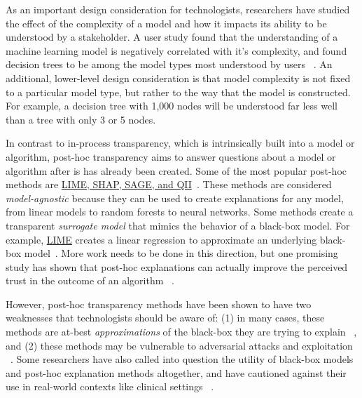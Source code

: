 As an important design consideration for technologists, researchers have studied the effect of the complexity of a model and how it impacts its ability to be understood by a stakeholder. A user study found that the understanding of a machine learning model is negatively correlated with it's complexity, and found decision trees to be among the model types most understood by users ~\cite{DBLP:conf/scai/AllahyariL11}. An additional, lower-level design consideration is that model complexity is not fixed to a particular model type, but rather to the way that the model is constructed. For example, a decision tree with 1,000 nodes will be understood far less well than a tree with only 3 or 5 nodes.

In contrast to in-process transparency, which is intrinsically built into a model or algorithm, post-hoc transparency aims to answer questions about a model or algorithm after is has already been created.  Some of the most popular post-hoc methods are \underline{LIME, SHAP, SAGE, and QII}~\cite{DBLP:conf/nips/LundbergL17, ribeiro2016should, datta2016algorithmic, DBLP:journals/corr/abs-2004-00668}. These methods are considered \emph{model-agnostic} because they can be used to create explanations for any model, from linear models to random forests to neural networks. Some methods create a transparent \emph{surrogate model} that mimics the behavior of a black-box model. For example, \underline{LIME} creates a linear regression to approximate an underlying black-box model~\cite{DBLP:conf/nips/LundbergL17}. More work needs to be done in this direction, but one promising study has shown that post-hoc explanations can actually improve the perceived trust in the outcome of an algorithm ~\cite{DBLP:conf/softcomp/BekriKH19}.

However, post-hoc transparency methods have been shown to have two weaknesses that technologists should be aware of: (1) in many cases, these methods are at-best \emph{approximations} of the black-box they are trying to explain ~\cite{zhang2019should}, and (2) these methods may be vulnerable to adversarial attacks and exploitation ~\cite{DBLP:conf/aies/SlackHJSL20}.  Some researchers have also called into question the utility of black-box models and post-hoc explanation methods altogether, and have cautioned against their use in real-world contexts like clinical settings ~\cite{rudin2019stop}.  %

